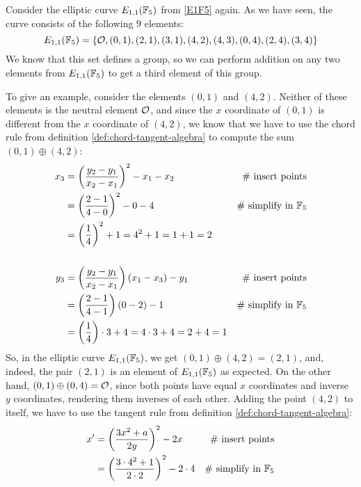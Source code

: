 \begin{example}\label{ex:01+42}
Consider the elliptic curve $E_{1,1}(\mathbb{F}_5)$ from \examplename{} \ref{E1F5} again. As we have seen, the curve consists of the following $9$ elements:
\begin{equation}
E_{1,1}(\mathbb{F}_5) = \{\mathcal{O}, (0,1),(2,1),(3,1),(4,2),(4,3),(0,4),(2,4),(3,4)\}
\end{equation}
We know that this set defines a group, so we can perform addition on any two elements from $E_{1,1}(\mathbb{F}_5)$ to get a third element of this group. 

To give an example, consider the elements $(0,1)$ and $(4,2)$. Neither of these elements is the neutral element $\mathcal{O}$, and since the $x$ coordinate of $(0,1)$ is different from the $x$ coordinate of $(4,2)$, we know that we have to use the chord rule from definition \ref{def:chord-tangent-algebra} to compute the sum $(0,1)\oplus (4,2)$:
\begin{align*}
x_3  & = \left(\frac{y_2-y_1}{x_2-x_1}\right)^2 -x_1-x_2 & \text{\# insert points}\\
     & = \left(\frac{2-1}{4-0}\right)^2 -0-4  & \text{\# simplify in } \mathbb{F}_5\\
     & = \left(\frac{1}{4}\right)^2 +1
       = 4^2 +1
       = 1 +1 
       = 2
\\
\\
y_3  & = \left(\frac{y_2-y_1}{x_2-x_1} \right)\left(x_1-x_3\right) - y_1  & \text{\# insert points}\\     
     & = \left(\frac{2-1}{4-1} \right)\left(0-2\right) - 1   & \text{\# simplify in } \mathbb{F}_5\\    
     & = \left(\frac{1}{4} \right)\cdot 3 + 4   
       = 4\cdot 3 + 4
       = 2 + 4
       = 1          
\end{align*} 
So, in the elliptic curve $E_{1,1}(\mathbb{F}_5)$, we get $(0,1)\oplus (4,2) =(2,1)$, and, indeed, the pair $(2,1)$ is an element of $E_{1,1}(\mathbb{F}_5)$ as expected. On the other hand, $(0,1)\oplus (0,4) =\mathcal{O}$, since both points have equal $x$ coordinates and inverse $y$ coordinates, rendering them inverses of each other. Adding the point $(4,2)$ to itself, we have to use the tangent rule from definition \ref{def:chord-tangent-algebra}:
\begin{align*}
x'  & = \left(\frac{3x^2+a}{2y}\right)^2 -2x   & \text{\# insert points}\\
    & = \left(\frac{3\cdot 4^2+1}{2\cdot 2}\right)^2 -2\cdot 4 & \text{\# simplify in } \F_5 \\

\end{align*}
\end{example}
